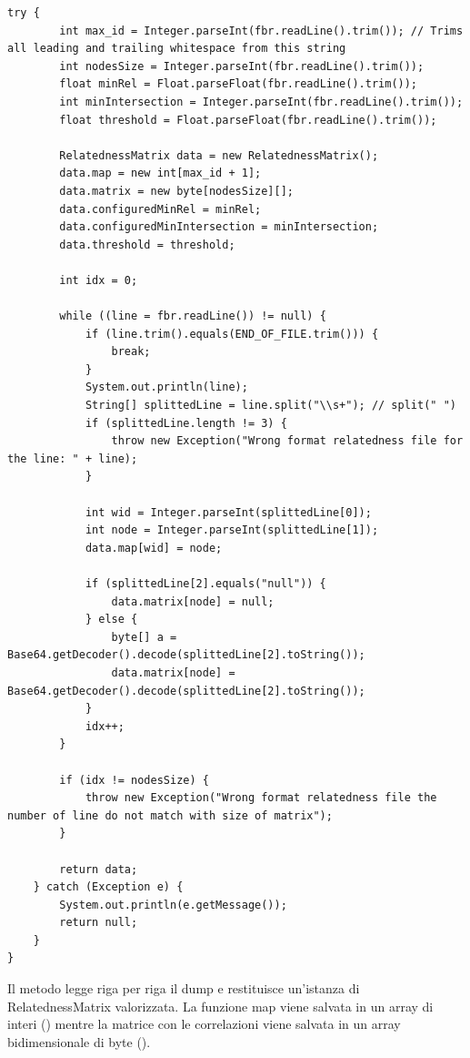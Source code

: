 \begin{lstlisting}[style=JavaStyle, caption=Implentazione nativa]
    try {   
        int max_id = Integer.parseInt(fbr.readLine().trim()); // Trims all leading and trailing whitespace from this string         
        int nodesSize = Integer.parseInt(fbr.readLine().trim());
        float minRel = Float.parseFloat(fbr.readLine().trim());
        int minIntersection = Integer.parseInt(fbr.readLine().trim());
        float threshold = Float.parseFloat(fbr.readLine().trim());         

        RelatednessMatrix data = new RelatednessMatrix();
        data.map = new int[max_id + 1];
        data.matrix = new byte[nodesSize][];
        data.configuredMinRel = minRel;
        data.configuredMinIntersection = minIntersection;
        data.threshold = threshold;

        int idx = 0;

        while ((line = fbr.readLine()) != null) {
            if (line.trim().equals(END_OF_FILE.trim())) {
                break;
            }
            System.out.println(line);
            String[] splittedLine = line.split("\\s+"); // split(" ")
            if (splittedLine.length != 3) {
                throw new Exception("Wrong format relatedness file for the line: " + line);
            }

            int wid = Integer.parseInt(splittedLine[0]);
            int node = Integer.parseInt(splittedLine[1]);
            data.map[wid] = node;

            if (splittedLine[2].equals("null")) {
                data.matrix[node] = null;
            } else {
                byte[] a = Base64.getDecoder().decode(splittedLine[2].toString()); 
                data.matrix[node] = Base64.getDecoder().decode(splittedLine[2].toString());
            }
            idx++;
        }
        
        if (idx != nodesSize) {
            throw new Exception("Wrong format relatedness file the number of line do not match with size of matrix");
        }
        
        return data;
    } catch (Exception e) {
        System.out.println(e.getMessage());
        return null;
    }
}
\end{lstlisting}

Il metodo  legge riga per riga il dump e restituisce un'istanza di RelatednessMatrix valorizzata. 
La funzione map viene salvata in un array di interi () mentre la matrice con le correlazioni viene salvata in un 
array bidimensionale di byte ().

